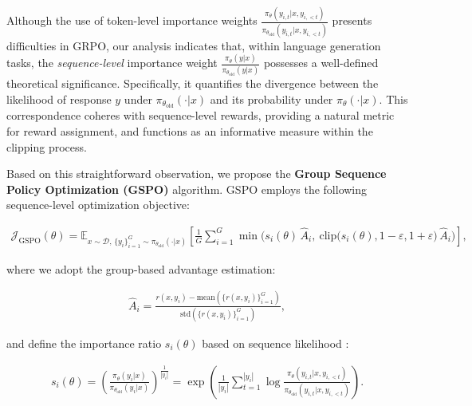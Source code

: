 Although the use of token-level importance weights $\frac{ \pi_{\theta} (y_{i,t} | x, y_{i,<t}) }{ \pi_{\theta_\text{old}} (y_{i,t} | x,y_{i,<t})}$ presents difficulties in GRPO, our analysis indicates that, within language generation tasks, the \textit{sequence-level} importance weight $\frac{ \pi_{\theta} (y | x) }{ \pi_{\theta_\text{old}} (y | x)}$ possesses a well-defined theoretical significance. Specifically, it quantifies the divergence between the likelihood of response $y$ under $\pi_{\theta_\text{old}} (\cdot | x)$ and its probability under $\pi_{\theta} (\cdot | x)$. This correspondence coheres with sequence-level rewards, providing a natural metric for reward assignment, and functions as an informative measure within the clipping process.

Based on this straightforward observation, we propose the \textbf{Group Sequence Policy Optimization (GSPO)} algorithm. GSPO employs the following sequence-level optimization objective:

\begin{align}
\mathcal{J}_\text{GSPO} (\theta) = 
\mathbb{E}_{x \sim \mathcal{D},\, \{y_i\}_{i=1}^G \sim \pi_{\theta_\text{old}}( \cdot | x)} 
\left[
\frac{1}{G} \sum_{i=1}^{G}
\min\Big( s_{i}(\theta)\, \widehat{A}_{i},\ \mathrm{clip}\big( s_{i}(\theta), 1 - \varepsilon, 1 + \varepsilon \big)\, \widehat{A}_{i} \Big)
\right],
\label{equ:gspo}
\end{align}

where we adopt the group-based advantage estimation:

\begin{align}
\widehat{A}_{i} = \frac{r(x, y_i) - \mathrm{mean} \left( \{ r(x, y_i) \}_{i=1}^G \right) }{ \mathrm{std} \left( \{ r(x, y_i) \}_{i=1}^G \right) },
\end{align}

and define the importance ratio $s_{i}(\theta)$ based on sequence likelihood \citep{click}:

\begin{align}
s_{i}(\theta) = \left( \frac{ \pi_{\theta} (y_i | x) }{ \pi_{\theta_\text{old}} (y_i | x)} \right)^{\frac{1}{|y_i|}}
=
\exp \left( \frac{1}{|y_i|} \sum_{t=1}^{|y_i|} \log \frac{ \pi_{\theta} (y_{i,t} | x, y_{i,<t}) }{ \pi_{\theta_\text{old}} (y_{i,t} | x,y_{i,<t})} \right).
\end{align}

